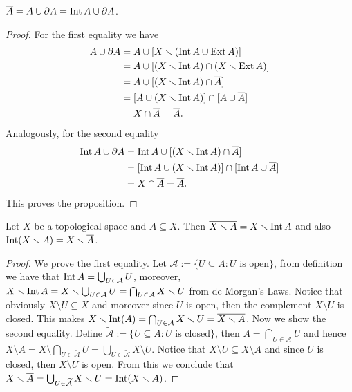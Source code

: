 \begin{proposition}
\label{prop:closure-composition}
\(\overline A = A \cup \partial A = \operatorname{Int} A \cup \partial A\).
\end{proposition}

\begin{proof}
For the first equality we have
\begin{align*}
  A \cup \partial A
  &= A \cup [X \smallsetminus (\operatorname{Int} A \cup \operatorname{Ext} A)] \\
  &= A \cup [(X \smallsetminus \operatorname{Int} A) \cap (X \smallsetminus \operatorname{Ext} A)] \\
  &= A \cup [(X \smallsetminus \operatorname{Int} A) \cap \overline{A}] \\
  &= [A \cup (X \smallsetminus \operatorname{Int} A)] \cap [A \cup \overline{A}] \\
  &= X \cap \overline{A} = \overline{A}.
\end{align*}
Analogously, for the second equality
\begin{align*}
  \operatorname{Int} A \cup \partial A
  &= \operatorname{Int} A \cup [(X \smallsetminus \operatorname{Int} A) \cap \overline A] \\
  &= [\operatorname{Int} A \cup (X \smallsetminus \operatorname{Int} A)] \cap [\operatorname{Int} A \cup \overline A] \\
  &= X \cap \overline A = \overline A.
\end{align*}
This proves the proposition.
\end{proof}

\begin{proposition}
Let \(X\) be a topological space and \(A \subseteq X\). Then \(\overline{X
\smallsetminus A} = X \smallsetminus \operatorname{Int} A\) and also \(\operatorname{Int}(X \smallsetminus A) =
X \smallsetminus \overline A\).
\end{proposition}

\begin{proof}
We prove the first equality. Let \(\mathcal A := \{U \subseteq A : U \text{ is
open}\}\), from definition we have that \(\operatorname{Int} A = \bigcup_{U \in \mathcal A}
U\), moreover, \(X \smallsetminus \operatorname{Int} A = X \smallsetminus \bigcup_{U \in \mathcal A} U
= \bigcap_{U \in \mathcal A} X \smallsetminus U\) from de Morgan's Laws. Notice that
obviously \(X \setminus U \subseteq X\) and moreover since \(U\) is open, then
the complement \(X \setminus U\) is closed. This makes \(X \smallsetminus \operatorname{Int}(A) =
\bigcap_{U \in \mathcal A} X \smallsetminus U = \overline{X \smallsetminus A}\). Now we
show the second equality. Define \(\mathcal{\widetilde A} := \{U \subseteq A : U
\text{ is closed}\}\), then \(\overline A = \bigcap_{U \in \mathcal{\widetilde
A}} U\) and hence \(X \setminus \overline A = X \setminus \bigcap_{U \in
\mathcal{\widetilde A}} U = \bigcup_{U \in \widetilde{\mathcal{A}}} X \setminus
U\). Notice that \(X\setminus U \subseteq X \setminus A\) and since \(U\) is
closed, then \(X \setminus U\) is open. From this we conclude that \(X \smallsetminus
\overline A = \bigcup_{U \in \mathcal{\widetilde A}} X \smallsetminus U = \operatorname{Int}(X
\smallsetminus A)\).
\end{proof}

